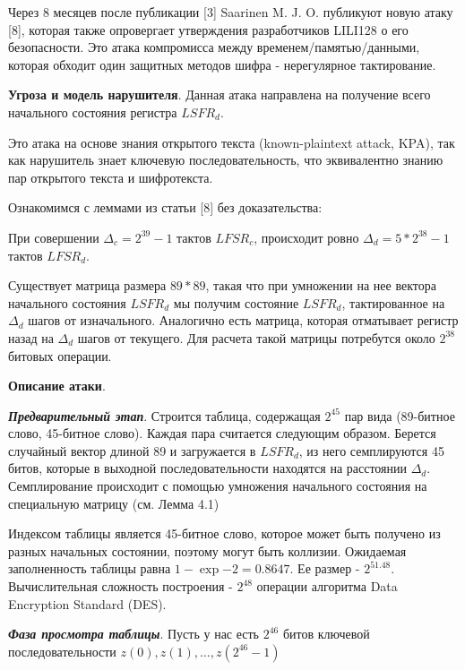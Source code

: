 \documentclass[colorthm]{./civarticle}
\begin{document}
Через 8 месяцев после публикации [3] Saarinen M. J. O. публикуют новую атаку [8], которая также опровергает утверждения разработчиков LILI128 о его безопасности. Это атака компромисса между временем/памятью/данными, которая обходит один защитных методов шифра - нерегулярное тактирование.

\textbf{Угроза и модель нарушителя}. Данная атака направлена на получение всего начального состояния регистра $LSFR_d$.

Это атака на основе знания открытого текста (known-plaintext attack, KPA), так как нарушитель знает ключевую последовательность, что эквивалентно знанию пар открытого текста и шифротекста.

Ознакомимся с леммами из статьи [8] без доказательства:

\begin{lemma}
    При совершении $\Delta_c = 2^{39}-1$ тактов $LFSR_c$, происходит ровно $\Delta_d = 5*2^{38} - 1$ тактов $LFSR_d$.
\end{lemma}

\begin{lemma}
    Существует матрица размера $89 * 89$, такая что при умножении на нее вектора начального состояния $LSFR_d$ мы получим состояние $LSFR_d$, тактированное на $\Delta_d$ шагов от изначального. Аналогично есть матрица, которая отматывает регистр назад на $\Delta_d$ шагов от текущего. Для расчета такой матрицы потребутся около $2^{38}$ битовых операции.
\end{lemma}

\textbf{Описание атаки}.

\textbf{\emph{Предварительный этап}}. Строится таблица, содержащая $2^{45}$ пар вида (89-битное слово, 45-битное слово). Каждая пара считается следующим образом. Берется случайный вектор длиной 89 и загружается в $LSFR_d$, из него семплируются 45 битов, которые в выходной последовательности находятся на расстоянии  $\Delta_d$. Семплирование происходит с помощью умножения начального состояния на специальную матрицу (см. Лемма 4.1)

Индексом таблицы является 45-битное слово, которое может быть получено из разных начальных состоянии, поэтому могут быть коллизии. Ожидаемая заполненность таблицы равна $1 - \exp{-2}=0.8647$. Ее размер - $2^{51.48}$. Вычислительная сложность построения - $2^{48}$ операции алгоритма Data Encryption Standard (DES).

\textbf{\emph{Фаза просмотра таблицы}}. Пусть у нас есть $2^{46}$ битов ключевой последовательности $z(0), z(1), \dots, z(2^{46}-1)$
\end{document}
